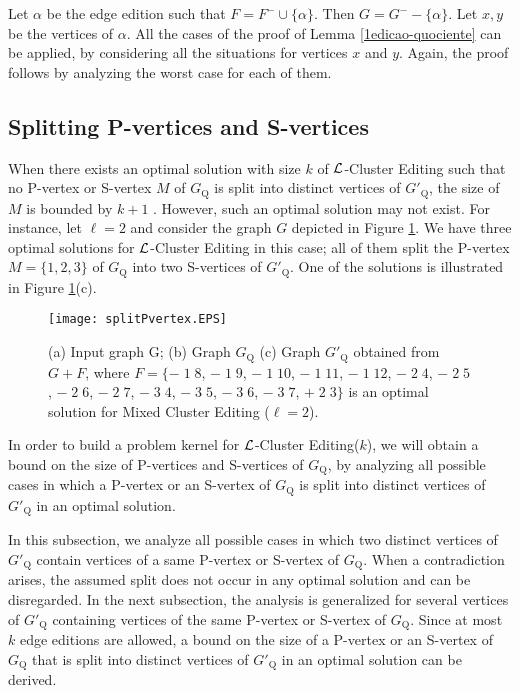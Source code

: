 \documentclass[12pt]{article}
\def\L{{\cal L}}
\begin{document}
Let $\alpha$ be the edge edition such that $F= F^- \cup
\{\alpha\}$. Then $G= G^- - \{\alpha\}$. Let $x,y$ be the vertices
of $\alpha$. All the cases of the proof of Lemma
\ref{1edicao-quociente} can be applied, by considering all the situations
for vertices $x$ and $y$. Again, the proof follows by analyzing the worst case for each of them. \hfill \framebox[.09in]


\subsection{Splitting P-vertices and S-vertices}

When there exists an optimal solution with size $k$ of $\L${\sc -Cluster Editing}
such that no P-vertex or S-vertex $M$ of $G_{\mathrm Q}$ is
split into distinct vertices of $G'_{\mathrm Q}$,
the size of $M$ is bounded by $k+1$ \cite{DSPS2006,DSPS2009}.
However, such an optimal solution may not exist.
For instance, let $\ell=2$ and consider the graph $G$ depicted in Figure \ref{splitPvertex}. We have
three optimal solutions for $\L${\sc -Cluster Editing} in this case; all of
them split the P-vertex $M=\{1,2,3\}$ of $G_{\mathrm Q}$ into two S-vertices
of $G'_{\mathrm Q}$. One of the solutions is illustrated in Figure \ref{splitPvertex}(c).

\begin{figure}[htb]
\centering
\texttt{[image: splitPvertex.EPS]}
\caption{\label{splitPvertex}(a) Input graph G; (b) Graph $G_{\mathrm Q}$ (c) Graph $G'_{\mathrm Q}$
obtained from $G+F$, where $F=\{-\;1\;8$, $-\;1\;9$, $-\;1\;10$, $-\;1\;11$, $-\;1\;12$,
$-\;2\;4$, $-\;2\;5$, $-\;2\;6$, $-\;2\;7$, $-\;3\;4$, $-\;3\;5$, $-\;3\;6$, $-\;3\;7$, $+\;2\;3\}$
is an optimal solution for {\sc Mixed Cluster Editing} ($\ell=2$).}
\end{figure}


In order to build a problem kernel for $\L${\sc -Cluster Editing}($k$),
we will obtain a bound on the size of P-vertices and S-vertices of
$G_{\mathrm Q}$, by analyzing all possible cases
in which a P-vertex or an S-vertex of $G_{\mathrm Q}$ is split into distinct vertices
of $G'_{\mathrm Q}$ in an optimal solution.

In this subsection, we analyze all possible cases in which two distinct vertices of $G'_{\mathrm Q}$ contain
vertices of a same P-vertex or S-vertex of $G_{\mathrm Q}$.
When a contradiction arises, the assumed split
does not occur in any optimal solution and can be disregarded.
In the next subsection, the analysis is generalized for several
vertices of $G'_{\mathrm Q}$ containing vertices of the same P-vertex or
S-vertex of $G_{\mathrm Q}$. Since at most $k$ edge editions are
allowed, a bound on the size of a P-vertex or an S-vertex of $G_{\mathrm Q}$
that is split into distinct vertices of $G'_{\mathrm Q}$ in an optimal solution can be derived.
\end{document}
